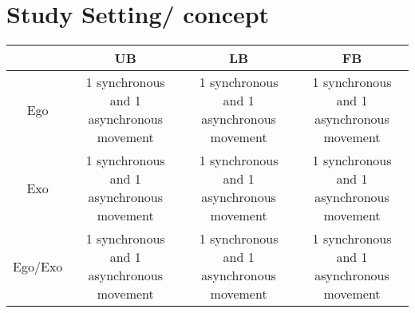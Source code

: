 \chapter{Study Setting/ concept}

\begin{center}
	\begin{tabular}{ | c | c | c | c | }
		\hline
		 & UB & LB & FB \\ \hline 
		Ego & \parbox{4cm}{1 synchronous and 1 asynchronous movement} & \parbox{4cm}{1 synchronous and 1 asynchronous movement} & \parbox{4cm}{1 synchronous and 1 asynchronous movement} \\ \hline 
		Exo & \parbox{4cm}{1 synchronous and 1 asynchronous movement} & \parbox{4cm}{1 synchronous and 1 asynchronous movement} & \parbox{4cm}{1 synchronous and 1 asynchronous movement} \\ \hline
		Ego/Exo & \parbox{4cm}{1 synchronous and 1 asynchronous movement} & \parbox{4cm}{1 synchronous and 1 asynchronous movement} & \parbox{4cm}{1 synchronous and 1 asynchronous movement} \\
		\hline
	\end{tabular}
\end{center}